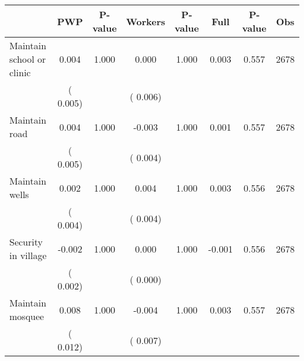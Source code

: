 
\begin{tabular}{l*{7}{c}}\hline&\multicolumn{1}{c}{PWP}&\multicolumn{1}{c}{P-value}&\multicolumn{1}{c}{Workers}&\multicolumn{1}{c}{P-value}&\multicolumn{1}{c}{Full}&\multicolumn{1}{c}{P-value}&\multicolumn{1}{c}{Obs} \\ \hline

 Maintain school or clinic       &              0.004       &        1.000  &              0.000       &        1.000  &              0.003       &              0.557 &  2678 \\ 
                       &       (       0.005)             &                               &       (       0.006)                     &                               &                                               &                                &                      \\ 

 Maintain road       &              0.004       &        1.000  &             -0.003       &        1.000  &              0.001       &              0.557 &  2678 \\ 
                       &       (       0.005)             &                               &       (       0.004)                     &                               &                                               &                                &                      \\ 

 Maintain wells       &              0.002       &        1.000  &              0.004       &        1.000  &              0.003       &              0.556 &  2678 \\ 
                       &       (       0.004)             &                               &       (       0.004)                     &                               &                                               &                                &                      \\ 

 Security in village       &             -0.002       &        1.000  &              0.000       &        1.000  &             -0.001       &              0.556 &  2678 \\ 
                       &       (       0.002)             &                               &       (       0.000)                     &                               &                                               &                                &                      \\ 

 Maintain mosquee       &              0.008       &        1.000  &             -0.004       &        1.000  &              0.003       &              0.557 &  2678 \\ 
                       &       (       0.012)             &                               &       (       0.007)                     &                               &                                               &                                &                      \\ 

\hline \end{tabular}